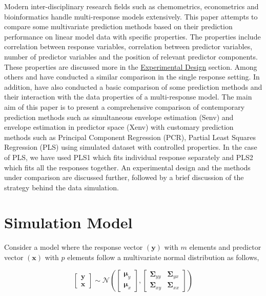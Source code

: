 \documentclass[review]{elsarticle}
\begin{document}
Modern inter-disciplinary research fields such as chemometrics,
econometrics and bioinformatics handle multi-response models
extensively. This paper attempts to compare some multivariate prediction
methods based on their prediction performance on linear model data with
specific properties. The properties include correlation between response
variables, correlation between predictor variables, number of predictor
variables and the position of relevant predictor components. These
properties are discussed more in the
\protect\hyperlink{experimental-design}{Experimental Design} section.
Among others \citet{saebo2015simrel} and \citet{Alm_y_1996} have
conducted a similar comparison in the single response setting. In
addition, \citet{Rimal2018} have also conducted a basic comparison of
some prediction methods and their interaction with the data properties
of a multi-response model. The main aim of this paper is to present a
comprehensive comparison of contemporary prediction methods such as
simultaneous envelope estimation (Senv) \citep{cook2015simultaneous} and
envelope estimation in predictor space (Xenv) \citep{cook2010envelope}
with customary prediction methods such as Principal Component Regression
(PCR), Partial Least Squares Regression (PLS) using simulated dataset
with controlled properties. In the case of PLS, we have used PLS1 which
fits individual response separately and PLS2 which fits all the
responses together. An experimental design and the methods under
comparison are discussed further, followed by a brief discussion of the
strategy behind the data simulation.

\section{Simulation Model}\label{simulation-model}

Consider a model where the response vector \((\mathbf{y})\) with \(m\)
elements and predictor vector \((\mathbf{x})\) with \(p\) elements
follow a multivariate normal distribution as follows,

\begin{equation}
  \begin{bmatrix}
    \mathbf{y} \\ \mathbf{x}
  \end{bmatrix} \sim \mathcal{N}
  \left(
    \begin{bmatrix}
      \boldsymbol{\mu}_y \\
      \boldsymbol{\mu}_x
    \end{bmatrix},
    \begin{bmatrix}
    \boldsymbol{\Sigma}_{yy} & \boldsymbol{\Sigma}_{yx} \\
    \boldsymbol{\Sigma}_{xy} & \boldsymbol{\Sigma}_{xx}
    \end{bmatrix}
  \right)
  \label{eq:model-1}
\end{equation}
\end{document}
